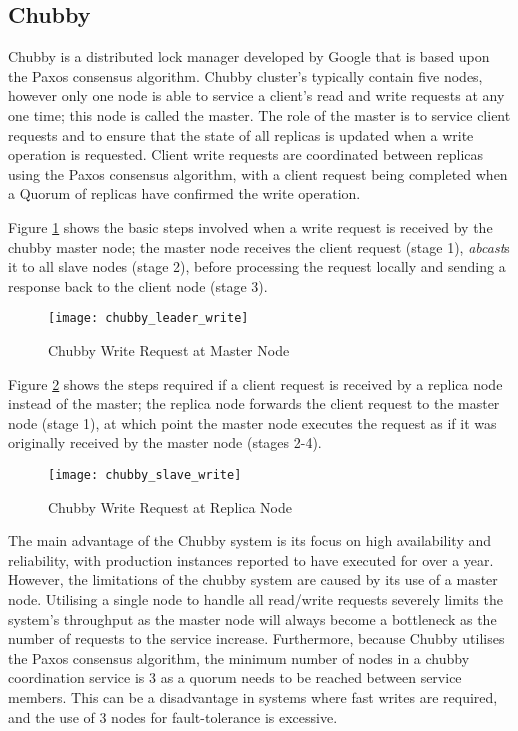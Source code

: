 	\subsection{Chubby}
	Chubby\citep{Burrows:2006:CLS:1298455.1298487} is a distributed lock manager developed by Google that is based upon the Paxos\citep{Lamport:1998:PP:279227.279229}\citep{Lamport:2001:PaxosMadeSimple} consensus algorithm. Chubby cluster's typically contain five nodes, however only one node is able to service a client's read and write requests at any one time; this node is called the master. The role of the master is to service client requests and to ensure that the state of all replicas is updated when a write operation is requested.  Client write requests are coordinated between replicas using the Paxos consensus algorithm, with a client request being completed when a Quorum of replicas have confirmed the write operation.  
	
Figure \ref{fig:chubby_leader_write} shows the basic steps involved when a write request is received by the chubby master node; the master node receives the client request (stage 1), \emph{abcast}s it to all slave nodes (stage 2), before processing the request locally and sending a response back to the client node (stage 3).  

	\begin{figure}[htbp!] 
	    \centering    
	    \texttt{[image: chubby\_leader\_write]}
	    \caption[Chubby Write Request at Master Node]{Chubby Write Request at Master Node}
	    \label{fig:chubby_leader_write}
	\end{figure}	 

Figure \ref{fig:chubby_slave_write} shows the steps required if a client request is received by a replica node instead of the master; the replica node forwards the client request to the master node (stage 1), at which point the master node executes the request as if it was originally received by the master node (stages 2-4).

	\begin{figure}[htbp!] 
	    \centering    
	    \texttt{[image: chubby\_slave\_write]}
	    \caption[Chubby Write Request at Replica Node]{Chubby Write Request at Replica Node}
	    \label{fig:chubby_slave_write}
	\end{figure}	 

The main advantage of the Chubby system is its focus on high availability and reliability, with production instances reported to have executed for over a year. However, the limitations of the chubby system are caused by its use of a master node. Utilising a single node to handle all read/write requests severely limits the system's throughput as the master node will always become a bottleneck as the number of requests to the service increase.  Furthermore, because Chubby utilises the Paxos consensus algorithm, the minimum number of nodes in a chubby coordination service is 3 as a quorum needs to be reached between service members.  This can be a disadvantage in systems where fast writes are required, and the use of 3 nodes for fault-tolerance is excessive.  
	
